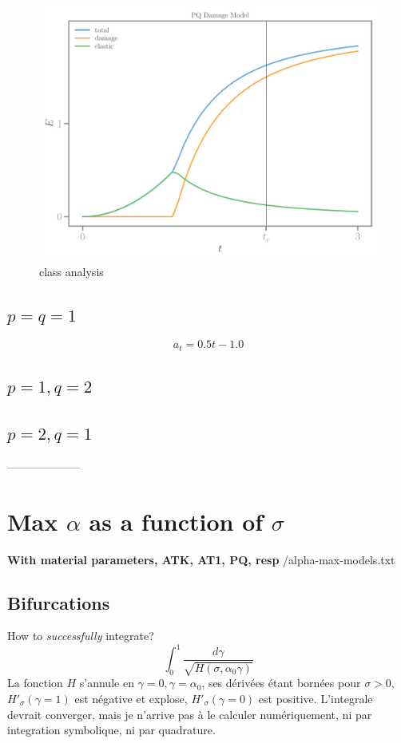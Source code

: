 \documentclass[]{article}
\begin{document}
\begin{figure}[htbp]
  \includegraphics[width=.33\textheight]{../figures/pq-energies-homog.pdf}
  \caption{class analysis}
  \label{fig:class-analyser}
\end{figure}


\subsection*{$p=q=1$}

$$
a_t = 0.5 t - 1.0
$$
\subsection*{$p=1, q=2$}
\subsection*{$p=2, q=1$}

--------------------


\section*{Max $\alpha$ as a function of $\sigma$}

\textbf{With material parameters, ATK, AT1, PQ, resp}
{/alpha-max-models.txt}


\clearpage

\subsection*{Bifurcations}
How to \emph{successfully} integrate? $$ \int_0^{1} \frac{d \gamma}{\sqrt{H(\sigma, \alpha_0 \gamma)}}
$$
La fonction $H$ s'annule en $\gamma=0, \gamma=\alpha_0$, ses dérivées étant bornées pour $\sigma>0$, 
$H'_\sigma(\gamma=1)$ est négative et explose, $H'_\sigma(\gamma=0)$ est positive.
L'integrale devrait converger, mais je n'arrive pas à le calculer numériquement, ni par integration symbolique, ni par quadrature.
\end{document}
